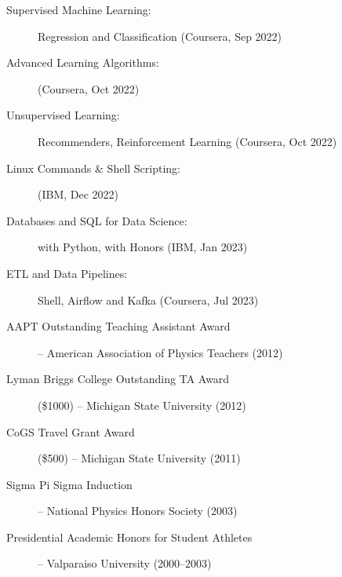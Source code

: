 \documentclass[10pt,letterpaper,ragged2e,withhyper,normalphoto]{altacv}
\begin{document}

\begin{description}
\item[Supervised Machine Learning:] Regression and Classification
  (Coursera, Sep 2022)
\item[Advanced Learning Algorithms:] (Coursera, Oct 2022)
\item[Unsupervised Learning:] Recommenders, Reinforcement Learning
  (Coursera, Oct 2022)
\item[Linux Commands \& Shell Scripting:] (IBM, Dec 2022)
\item[Databases and SQL for Data Science:] with Python, with Honors
  (IBM, Jan 2023)
\item[ETL and Data Pipelines:] Shell, Airflow and Kafka (Coursera, Jul
  2023)
\end{description}


\begin{description}
\item[AAPT Outstanding Teaching Assistant Award] -- American
  Association of Physics Teachers (2012)
\item[Lyman Briggs College Outstanding TA Award] (\$1000) -- Michigan
  State University (2012)
\item[CoGS Travel Grant Award] (\$500) -- Michigan State University
  (2011)
\item[Sigma Pi Sigma Induction] -- National Physics Honors Society
  (2003)
\item[Presidential Academic Honors for Student Athletes] -- Valparaiso
  University (2000--2003)
\end{description}
\end{document}
